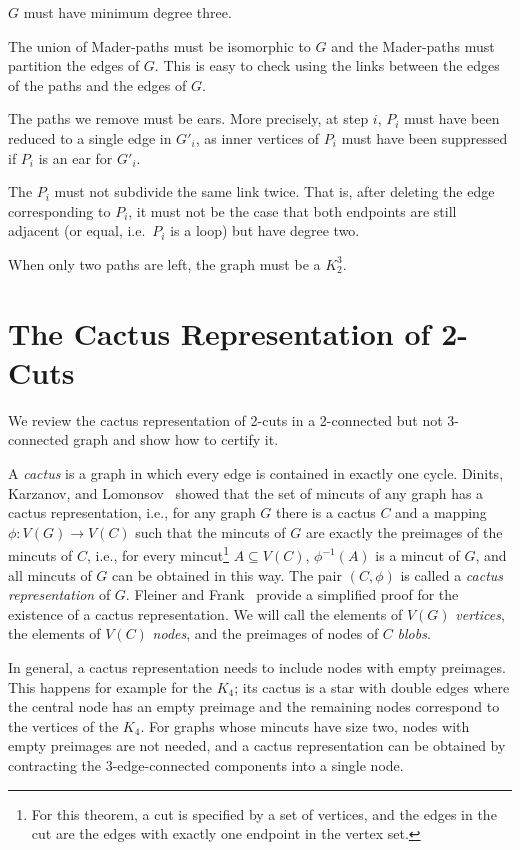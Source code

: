 \documentclass[paper=a4]{scrartcl}
\begin{document}
\begin{compactitem}
\item $G$ must have minimum degree three.
\item The union of Mader-paths must be isomorphic to $G$ and the Mader-paths must partition the edges of $G$. This is easy to check using the links between the edges of the paths and the edges of $G$.
\item The paths we remove must be ears. More precisely, at step $i$, $P_i$ must have been reduced to a single edge in $G'_i$, as inner vertices of $P_i$ must have been suppressed if $P_i$ is an ear for $G'_i$.
\item The $P_i$ must not subdivide the same link twice. That is, after deleting the edge corresponding to $P_i$, it must not be the case that both endpoints are still adjacent (or equal, i.e.\ $P_i$ is a loop) but have degree two.
\item When only two paths are left, the graph must be a $K_2^3$.
\end{compactitem}




\section{The Cactus Representation of 2-Cuts}\label{Sec: Cactus Representation}
We review the cactus representation of 2-cuts in a 2-connected but not 3-connected graph and show how to certify it.

A \emph{cactus} is a graph in which every edge is contained in exactly one cycle. Dinits, Karzanov, and Lomonsov~\cite{Dinits-Karzanov-Lomonosov} showed that the set of mincuts of any graph has a cactus representation, i.e., for any graph $G$ there is a cactus $C$ and a mapping $\phi: V(G) \rightarrow V(C)$ such that the mincuts of $G$ are exactly the preimages of the mincuts of $C$, i.e., for every mincut\footnote{For this theorem, a cut is specified by a set of vertices, and the edges in the cut are the edges with exactly one endpoint in the vertex set.} $A \subseteq V(C)$, $\phi^{-1}(A)$ is a mincut of $G$, and all mincuts of $G$ can be obtained in this way. The pair $(C,\phi)$ is called a \emph{cactus representation} of $G$. Fleiner and Frank~\cite{Fleiner2009} provide a simplified proof for the existence of a cactus representation. We will call the elements of $V(G)$ \emph{vertices}, the elements of $V(C)$ \emph{nodes}, and the preimages of nodes of $C$ \emph{blobs}.

In general, a cactus representation needs to include nodes with empty preimages. This happens for example for the $K_4$; its cactus is a star with double edges where the central node has an empty preimage and the remaining nodes correspond to the vertices of the $K_4$. For graphs whose mincuts have size two, nodes with empty preimages are not needed, and a cactus representation can be obtained by contracting the 3-edge-connected components into a single node. 
\end{document}
